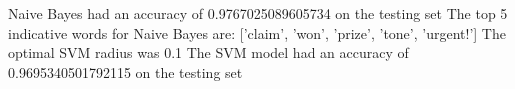 \begin{answer}
    
    Naive Bayes had an accuracy of 0.9767025089605734 on the testing set
    The top 5 indicative words for Naive Bayes are:  ['claim', 'won', 'prize', 'tone', 'urgent!']
    The optimal SVM radius was 0.1
    The SVM model had an accuracy of 0.9695340501792115 on the testing set
\end{answer}